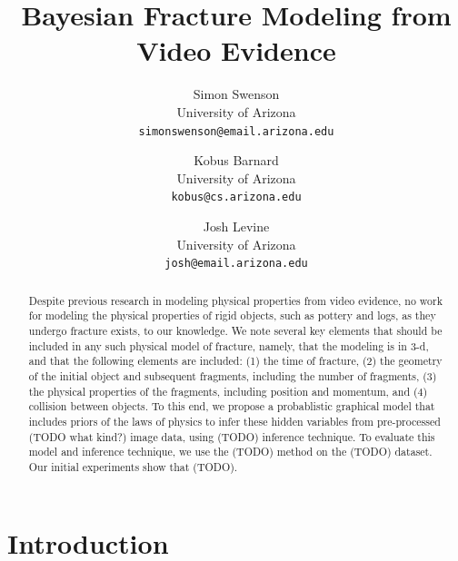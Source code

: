 \documentclass[10pt,twocolumn,letterpaper]{article}
\begin{document}
\title{Bayesian Fracture Modeling from Video Evidence}

\author{Simon Swenson\\
University of Arizona\\
{\tt\small simonswenson@email.arizona.edu}
\and
Kobus Barnard\\
University of Arizona\\
{\tt\small kobus@cs.arizona.edu}
\and
Josh Levine\\
University of Arizona\\
{\tt\small josh@email.arizona.edu}
}

\maketitle

\begin{abstract}
    Despite previous research in modeling physical properties from video 
    evidence, no work for modeling the physical properties of rigid objects, 
    such as pottery and logs,
    as they undergo fracture exists, to our knowledge. We note several key 
    elements that should be included in any such physical model of fracture, 
    namely, that the modeling is in 3-d, and that the following elements are 
    included: (1) the time of fracture, (2) the geometry of the initial object 
    and subsequent fragments, including the number of fragments, (3) the 
    physical properties of the fragments, including position and momentum, and 
    (4) collision between objects. To 
    this end, we propose a probablistic graphical model that includes priors 
    of the laws of physics to infer these hidden 
    variables from pre-processed (TODO what kind?) image data, using (TODO) 
    inference technique. To evaluate this model and inference technique, we 
    use the (TODO) method on the (TODO) dataset. 
    Our initial experiments show that (TODO).
\end{abstract}

\section{Introduction}
\end{document}
